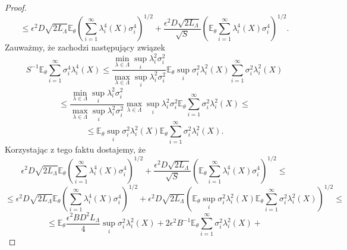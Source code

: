 \documentclass{article}
\begin{document}
\begin{proof}
\begin{displaymath}
\end{displaymath}
\begin{displaymath}
\leq \epsilon^2D\sqrt{2L_{\Lambda}}\mathbb{E}_{\theta}\left(\sum_{i=1}^{\infty}\lambda_i^4(X)\sigma_i^4\right)^{1/2}+\frac{\epsilon^2D\sqrt{2L_{\Lambda}}}{\sqrt{S}}\left(\mathbb{E}_{\theta}\sum_{i=1}^{\infty}\lambda_i^4(X)\sigma_i^4\right)^{1/2}.
\end{displaymath}
Zauważmy, że zachodzi następujący związek
\begin{displaymath}
S^{-1}\mathbb{E}_{\theta}\sum_{i=1}^{\infty}\sigma_i^4\lambda_i^4(X)\leq \frac{\min_{\lambda\in \Lambda}\sup_i \lambda_i^2\sigma_i^2}{\max_{\lambda\in \Lambda}\sup_i \lambda_i^2\sigma_i^2}\mathbb{E}_{\theta}\sup_i\sigma_i^2\lambda_i^2(X)\sum_{i=1}^{\infty}\sigma_i^2\lambda_i^2(X)
\end{displaymath}
\begin{displaymath}
\leq \frac{\min_{\lambda\in \Lambda}\sup_i \lambda_i^2\sigma_i^2}{\max_{\lambda\in \Lambda}\sup_i \lambda_i^2\sigma_i^2}\max_{\lambda\in \Lambda}\sup_i \lambda_i^2\sigma_i^2\mathbb{E}_{\theta}\sum_{i=1}^{\infty}\sigma_i^2\lambda_i^2(X)\leq
\end{displaymath}
\begin{displaymath}
\leq \mathbb{E}_{\theta}\sup_i\sigma_i^2\lambda_i^2(X)\mathbb{E}_{\theta}\sum_{i=1}^{\infty}\sigma_i^2\lambda_i^2(X).
\end{displaymath}
Korzystając z tego faktu dostajemy, że
\begin{displaymath}
\epsilon^2D\sqrt{2L_{\Lambda}}\mathbb{E}_{\theta}\left(\sum_{i=1}^{\infty}\lambda_i^4(X)\sigma_i^4\right)^{1/2}+\frac{\epsilon^2D\sqrt{2L_{\Lambda}}}{\sqrt{S}}\left(\mathbb{E}_{\theta}\sum_{i=1}^{\infty}\lambda_i^4(X)\sigma_i^4\right)^{1/2}\leq
\end{displaymath}
\begin{displaymath}
\leq \epsilon^2D\sqrt{2L_{\Lambda}}\mathbb{E}_{\theta}\left(\sum_{i=1}^{\infty}\lambda_i^4(X)\sigma_i^4\right)^{1/2}+\epsilon^2D\sqrt{2L_{\Lambda}}\left(\mathbb{E}_{\theta}\sup_i\sigma_i^2\lambda_i^2(X)\mathbb{E}_{\theta}\sum_{i=1}^{\infty}\sigma_i^2\lambda_i^2(X)\right)^{1/2}\leq
\end{displaymath}
\begin{displaymath}
\leq \mathbb{E}_{\theta}\frac{\epsilon^2BD^2L_{\Lambda}}{4}\sup_i\sigma_i^2\lambda_i^2(X)+2\epsilon^2B^{-1}\mathbb{E}_{\theta}\sum_{i=1}^{\infty}\sigma_i^2\lambda_i^2(X)+
\end{displaymath}
\begin{displaymath}

\end{displaymath}
\end{proof}
\end{document}

